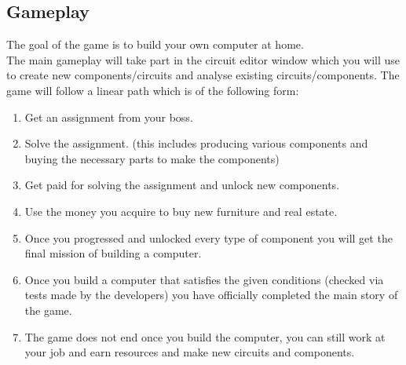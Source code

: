\documentclass[12pt]{article}
\begin{document}
\subsection{Gameplay}
The goal of the game is to build your own computer at home.\\
The main gameplay will take part in the circuit editor window which you will use to create new components/circuits 
and analyse existing circuits/components.
The game will follow a linear path which is of the following form:
\begin{enumerate}
    \item Get an assignment from your boss.
    \item Solve the assignment. (this includes producing various components and buying the necessary parts to make the components)
    \item Get paid for solving the assignment and unlock new components.
    \item Use the money you acquire to buy new furniture and real estate.
    \pagebreak
    \item Once you progressed and unlocked every type of component you will get the final mission of building a computer.
    \item Once you build a computer that satisfies the given conditions (checked via tests made by the developers) you have officially completed the main story of the game.
    \item The game does not end once you build the computer, you can still work at your job and earn resources and make new circuits and components.
\end{enumerate}
\end{document}
